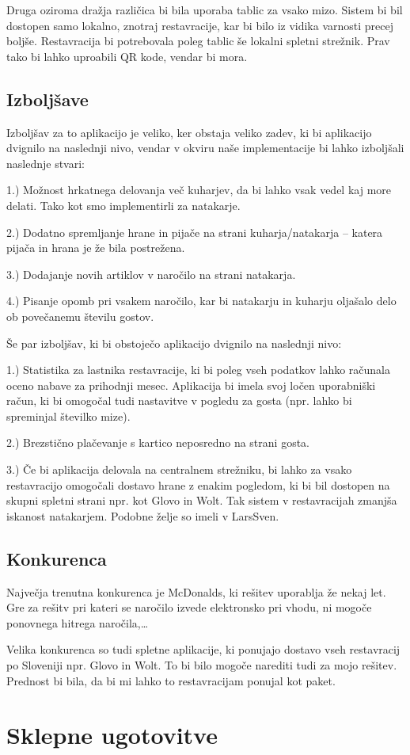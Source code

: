 \documentclass[a4paper, 12pt]{book}
\begin{document}
Druga oziroma dražja različica bi bila uporaba tablic za vsako mizo. Sistem bi bil dostopen samo lokalno, znotraj restavracije, kar bi bilo iz vidika varnosti precej boljše. Restavracija bi potrebovala poleg tablic še lokalni spletni strežnik. Prav tako bi lahko uproabili QR kode, vendar bi mora.

\section{Izboljšave}

Izboljšav za to aplikacijo je veliko, ker obstaja veliko zadev, ki bi aplikacijo dvignilo na naslednji nivo, vendar v okviru naše implementacije bi lahko izboljšali naslednje stvari:

1.) Možnost hrkatnega delovanja več kuharjev, da bi lahko vsak vedel kaj more delati. Tako kot smo implementirli za natakarje.

2.) Dodatno spremljanje hrane in pijače na strani kuharja/natakarja – katera pijača in hrana je že bila postrežena.

3.) Dodajanje novih artiklov v naročilo na strani natakarja.

4.) Pisanje opomb pri vsakem naročilo, kar bi natakarju in kuharju oljašalo delo ob povečanemu številu gostov.

Še par izboljšav, ki bi obstoječo aplikacijo dvignilo na naslednji nivo:

1.) Statistika za lastnika restavracije, ki bi poleg vseh podatkov lahko računala oceno nabave za prihodnji mesec. Aplikacija bi imela svoj ločen uporabniški račun, ki bi omogočal tudi nastavitve v pogledu za gosta (npr. lahko bi spreminjal številko mize). 

2.) Brezstično plačevanje s kartico neposredno na strani gosta.

3.) Če bi aplikacija delovala na centralnem strežniku, bi lahko za vsako restavracijo omogočali dostavo hrane z enakim pogledom, ki bi bil dostopen na skupni spletni strani npr. kot Glovo in Wolt.
Tak sistem v restavracijah zmanjša iskanost natakarjem. Podobne želje so imeli v LarsSven.  


\section{Konkurenca}

Največja trenutna konkurenca je McDonalds, ki rešitev uporablja že nekaj let. Gre za rešitv pri kateri se naročilo izvede elektronsko pri vhodu, ni mogoče ponovnega hitrega naročila,… 

Velika konkurenca so tudi spletne aplikacije, ki ponujajo dostavo vseh restavracij po Sloveniji npr. Glovo in Wolt. To bi bilo mogoče narediti tudi za mojo rešitev. Prednost bi bila, da bi mi lahko to restavracijam ponujal kot paket.

\chapter {Sklepne ugotovitve}
\newpage %
\ \\
\clearpage
{}


\end{document}
